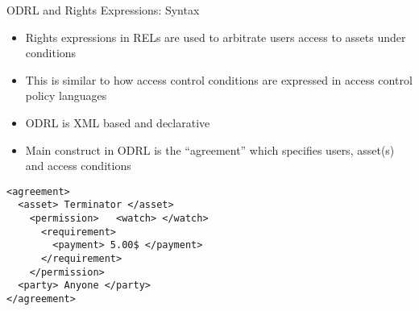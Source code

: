 \documentclass{beamer}
\begin{document}
\begin{frame}[fragile]{ODRL and Rights Expressions: Syntax}
\begin{itemize}
  \item Rights expressions in RELs are used to arbitrate users access to assets under conditions
  \item This is similar to how access control conditions are expressed in access control policy languages
  \item ODRL is XML based and declarative
  \item Main construct in ODRL is the ``agreement'' which specifies users, asset(s) and access conditions
\end{itemize}
\lstset{language=XML}
\begin{lstlisting}[caption={Syntax of an Agreement in ODRL in XML}]
<agreement> 
  <asset> Terminator </asset> 
    <permission>   <watch> </watch>  
      <requirement>   
        <payment> 5.00$ </payment>
      </requirement> 
    </permission> 
  <party> Anyone </party>
</agreement>
\end{lstlisting}
\end{frame}
\end{document}
